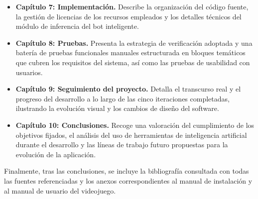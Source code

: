 \begin{itemize}
	\item \textbf{Capítulo 7: Implementación.} Describe la organización del código fuente, la gestión de licencias de los recursos empleados y los detalles técnicos del módulo de inferencia del bot inteligente.
	
	\item \textbf{Capítulo 8: Pruebas.} Presenta la estrategia de verificación adoptada y una batería de pruebas funcionales manuales estructurada en bloques temáticos que cubren los requisitos del sistema, así como las pruebas de usabilidad con usuarios.
	
	\item \textbf{Capítulo 9: Seguimiento del proyecto.} Detalla el transcurso real y el progreso del desarrollo a lo largo de las cinco iteraciones completadas, ilustrando la evolución visual y los cambios de diseño del software.
	
	\item \textbf{Capítulo 10: Conclusiones.} Recoge una valoración del cumplimiento de los objetivos fijados, el análisis del uso de herramientas de inteligencia artificial durante el desarrollo y las líneas de trabajo futuro propuestas para la evolución de la aplicación.
	
\end{itemize}

 Finalmente, tras las conclusiones, se incluye la bibliografía consultada con todas las fuentes referenciadas y los anexos correspondientes al manual de instalación y al manual de usuario del videojuego.